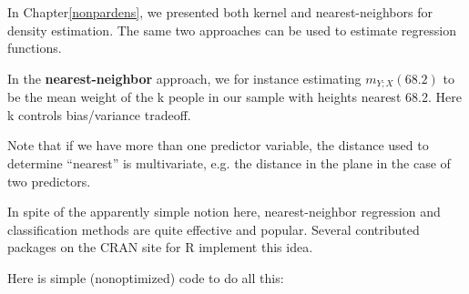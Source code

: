 In Chapter\ref{nonpardens}, we presented both kernel and
nearest-neighbors for density estimation.  The same two approaches can
be used to estimate regression functions.  

In the {\bf nearest-neighbor} approach, we for instance estimating
$m_{Y;X}(68.2)$ to be the mean weight of the k people in our sample with
heights nearest 68.2.  Here k controls bias/variance tradeoff.

Note that if we have more than one predictor variable, the
distance used to determine ``nearest'' is multivariate, e.g. the
distance in the plane in the case of two predictors.

In spite of the apparently simple notion here, nearest-neighbor
regression and classification methods are quite effective and popular.
Several contributed packages on the CRAN site for R implement this idea.

Here is simple (nonoptimized) code to do all this:

